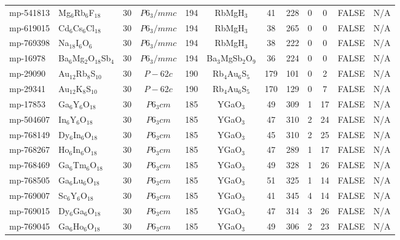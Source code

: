 {\begin{longtable}{llcccccccccc}
    mp-541813 & Mg$_{6}$Rb$_{6}$F$_{18}$ & 30    & $P6_3/mmc$ & 194   & RbMgH$_{3}$ & 41    & 228   & 0     & 0     & FALSE & N/A \\
    mp-619015 & Cd$_{6}$Cs$_{6}$Cl$_{18}$ & 30    & $P6_3/mmc$ & 194   & RbMgH$_{3}$ & 38    & 265   & 0     & 0     & FALSE & N/A \\
    mp-769398 & Na$_{18}$I$_{6}$O$_{6}$ & 30    & $P6_3/mmc$ & 194   & RbMgH$_{3}$ & 38    & 222   & 0     & 0     & FALSE & N/A \\
    mp-16978 & Ba$_{6}$Mg$_{2}$O$_{18}$Sb$_{4}$ & 30    & $P6_3/mmc$ & 194   & Ba$_{3}$MgSb$_{2}$O$_{9}$ & 36    & 224   & 0     & 0     & FALSE & N/A \\
    mp-29090 & Au$_{12}$Rb$_{8}$S$_{10}$ & 30    & $P-62c$ & 190   & Rb$_{4}$Au$_{6}$S$_{5}$ & 179   & 101   & 0     & 2     & FALSE & N/A \\
    mp-29341 & Au$_{12}$K$_{8}$S$_{10}$ & 30    & $P-62c$ & 190   & Rb$_{4}$Au$_{6}$S$_{5}$ & 170   & 129   & 0     & 7     & FALSE & N/A \\
    mp-17853 & Ga$_{6}$Y$_{6}$O$_{18}$ & 30    & $P6_3cm$ & 185   & YGaO$_{3}$ & 49    & 309   & 1     & 17    & FALSE & N/A \\
    mp-504607 & In$_{6}$Y$_{6}$O$_{18}$ & 30    & $P6_3cm$ & 185   & YGaO$_{3}$ & 47    & 310   & 2     & 24    & FALSE & N/A \\
    mp-768149 & Dy$_{6}$In$_{6}$O$_{18}$ & 30    & $P6_3cm$ & 185   & YGaO$_{3}$ & 45    & 310   & 2     & 25    & FALSE & N/A \\
    mp-768267 & Ho$_{6}$In$_{6}$O$_{18}$ & 30    & $P6_3cm$ & 185   & YGaO$_{3}$ & 47    & 289   & 1     & 17    & FALSE & N/A \\
    mp-768469 & Ga$_{6}$Tm$_{6}$O$_{18}$ & 30    & $P6_3cm$ & 185   & YGaO$_{3}$ & 49    & 328   & 1     & 26    & FALSE & N/A \\
    mp-768505 & Ga$_{6}$Lu$_{6}$O$_{18}$ & 30    & $P6_3cm$ & 185   & YGaO$_{3}$ & 51    & 325   & 1     & 14    & FALSE & N/A \\
    mp-769007 & Sc$_{6}$Y$_{6}$O$_{18}$ & 30    & $P6_3cm$ & 185   & YGaO$_{3}$ & 41    & 345   & 4     & 14    & FALSE & N/A \\
    mp-769015 & Dy$_{6}$Ga$_{6}$O$_{18}$ & 30    & $P6_3cm$ & 185   & YGaO$_{3}$ & 47    & 314   & 3     & 26    & FALSE & N/A \\
    mp-769045 & Ga$_{6}$Ho$_{6}$O$_{18}$ & 30    & $P6_3cm$ & 185   & YGaO$_{3}$ & 49    & 306   & 2     & 23    & FALSE & N/A \\

\end{longtable}}
